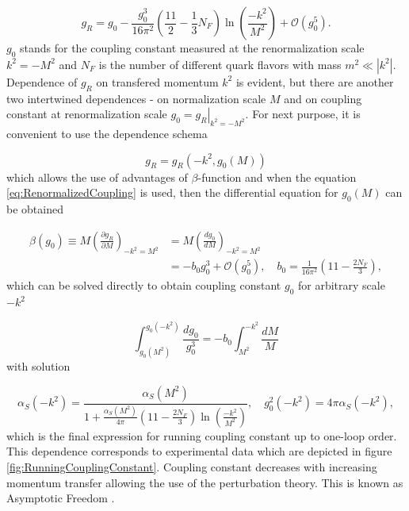 \documentclass[a4paper,11pt]{report}
\begin{document}
\begin{equation}
  g_R = g_0 - \frac{g_0^3}{16\pi^2} \left( \frac{11}{2} - \frac{1}{3}N_F \right)
  \ln \left( \frac{-k^2}{M^2} \right) + \mathscr{O}(g_0^5).
  \label{eq:RenormalizedCoupling}
\end{equation}
$g_0$ stands for the coupling constant measured at the renormalization scale
$k^2 = -M^2$ and $N_F$ is the number of different quark flavors with mass $m^2
\ll \left| k^2 \right|$. Dependence of $g_R$ on transfered momentum $k^2$ is
evident, but there are another two intertwined dependences - on normalization
scale $M$ and on coupling constant at renormalization scale $g_0 =
\left. g_R \right|_{k^2=-M^2}$. For next purpose, it is convenient to use the
dependence schema

\begin{equation}
  g_R = g_R(-k^2,g_0(M))
  \label{eq:RunningCouplingConstantDependenceSchema}
\end{equation}
which allows the use of advantages of $\beta$-function and when the equation
\eqref{eq:RenormalizedCoupling} is used, then the differential
equation for $g_0(M)$ can be obtained

\begin{align}
  \beta(g_0) \equiv M \left( \frac{\partial g_R}{\partial M} \right)_{-k^2=M^2}
  &= M \left( \frac{dg_0}{dM} \right)_{-k^2=M^2}
  \label{eq:BetaFunction1} \\
  &= -b_0 g_0^3 + \mathscr{O}(g_0^5)
  , \quad b_0 = \frac{1}{16\pi^2}\left(11-\frac{2N_F}{3}\right),
  \label{eq:BetaFunction2}
\end{align}
which can be solved directly to obtain coupling constant $g_0$ for arbitrary
scale $-k^2$

\begin{equation}
  \int_{g_0(M^2)}^{g_0(-k^2)} \frac{dg_0}{g_0^3} =
  -b_0 \int_{M^2}^{-k^2}\frac{dM}{M}
  \label{eq:RunningCouplingConstantIntegralEquation}
\end{equation}
with solution

\begin{equation}
  \alpha_S(-k^2) = \frac{\alpha_S(M^2)}{1 + \frac{\alpha_S(M^2)}{4\pi} \left(
  11-\frac{2N_F}{3} \right) \ln \left( \frac{-k^2}{M^2} \right) }
  , \quad g_0^2(-k^2) = 4 \pi \alpha_S( -k^2 ),
  \label{eq:RunningCouplingConstant}
\end{equation}
which is the final expression for running coupling constant up to one-loop
order. This dependence corresponds to experimental data which are depicted in
figure \ref{fig:RunningCouplingConstant}. Coupling constant decreases with
increasing momentum transfer allowing the use of the perturbation theory. This
is known as Asymptotic Freedom \cite{AssymptoticFreedom}.
\end{document}

